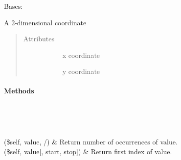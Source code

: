 \documentclass[letterpaper,10pt,english]{sphinxmanual}
\begin{document}
\begin{fulllineitems}
\label{\detokenize{dataTypes:dataTypes.Point}}
Bases: 

A 2-dimensional coordinate
\begin{quote}\begin{description}
\item[{Attributes}] \leavevmode\begin{description}
\item[{{\hyperref[\detokenize{dataTypes:dataTypes.Point.x}]{}}}] \leavevmode
x coordinate

\item[{{\hyperref[\detokenize{dataTypes:dataTypes.Point.y}]{}}}] \leavevmode
y coordinate

\end{description}

\end{description}\end{quote}
\paragraph{Methods}


\begin{savenotes}\sphinxatlongtablestart\begin{longtable}{}
\hline

\endfirsthead

%
{}\\
\hline

\endhead

\hline
{}\\
\endfoot

\endlastfoot

(\$self, value, /)
&
Return number of occurrences of value.
\\
\hline
{}(\$self, value{[}, start, stop{]})
&
Return first index of value.
\\
\hline
\end{longtable}\sphinxatlongtableend\end{savenotes}


\end{fulllineitems}
\end{document}
